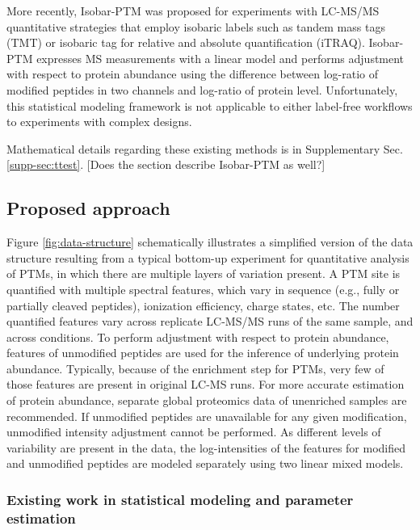 \documentclass[mcp]{article}
\numberwithin{table}{section}
\def\todo#1{{\color{red}[#1]}}
\begin{document}
More recently, Isobar-PTM was proposed for experiments with LC-MS/MS quantitative strategies that employ isobaric labels such as tandem mass tags (TMT) or isobaric tag for relative and absolute quantification (iTRAQ)\cite{Breitwieser:2013}. Isobar-PTM expresses MS measurements with a linear model and performs adjustment with respect to protein abundance using the difference between log-ratio of modified peptides in two channels and log-ratio of protein level. Unfortunately, this statistical modeling framework is not applicable to either label-free workflows to experiments with complex designs. 

Mathematical details regarding these existing methods is in Supplementary Sec. \ref{supp-sec:ttest}. \todo{Does the section describe Isobar-PTM as well?}

\subsection*{Proposed approach}

Figure \ref{fig:data-structure} schematically illustrates a simplified version of the data structure resulting from a typical bottom-up experiment for quantitative analysis of PTMs, in which there are multiple layers of variation present. A PTM site is quantified with multiple spectral features, which vary in sequence (e.g., fully or partially cleaved peptides), ionization efficiency, charge states, etc. The number quantified features vary across replicate LC-MS/MS runs of the same sample, and across conditions. To perform adjustment with respect to protein abundance, features of unmodified peptides are used for the inference of underlying protein abundance. Typically, because of the enrichment step for PTMs, very few of those features are present in original LC-MS runs. For more accurate estimation of protein abundance, separate global proteomics data of unenriched samples are recommended. If unmodified peptides are unavailable for any given modification, unmodified intensity adjustment cannot be performed. As different levels of variability are present in the data, the log-intensities of the features for modified and unmodified peptides are modeled separately using two linear mixed models.

\subsubsection*{Existing work in statistical modeling and parameter estimation}
\end{document}
